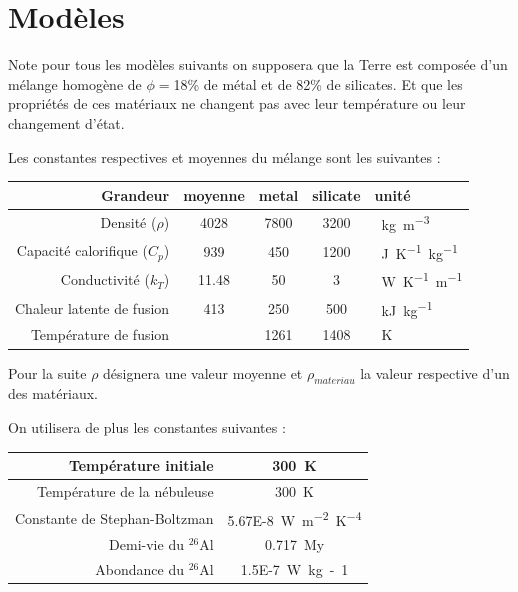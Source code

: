 \documentclass[10pt,a4paper]{article}
\numberwithin{equation}{section}
\begin{document}
\section{Modèles}

Note pour tous les modèles suivants on supposera que la Terre est composée d'un mélange homogène de $\phi = $18\% de métal et de 82\% de silicates. Et que les propriétés de ces matériaux ne changent pas avec leur température ou leur changement d'état.

Les constantes respectives et moyennes du mélange sont les suivantes :
\tabulinesep=0.3mm
\begin{center}
  \begin{tabu}{ r | c c c l}
    Grandeur & moyenne & metal & silicate & unité\\ \hline
    Densité ($\rho$) & 4028 & 7800 &  3200 & \SI{}{kg.m^{-3}}\\ \hline
    Capacité calorifique ($C_p$) & 939 & 450 & 1200 &  \SI{}{J.K^{-1}.kg^{-1}} \\ \hline
    Conductivité ($k_T$)& 11.48 & 50 & 3 & \SI{}{W.K^{-1}.m^{-1}}  \\ \hline    
    Chaleur latente de fusion & 413 & 250 & 500 & \SI{}{kJ.kg^{-1}}\\ \hline
    Température de fusion & & 1261 & 1408 & \SI{}{K}\\ \hline

  \end{tabu}
\end{center}

Pour la suite $\rho$ désignera une valeur moyenne et $\rho_{materiau}$ la valeur respective d'un des matériaux.

On utilisera de plus les constantes suivantes :

\begin{center}
  \begin{tabu}{ r  c }
    \hline
    Température initiale & \SI{300}{K}  \\ \hline
    Température de la nébuleuse & \SI{300}{K}  \\ \hline
    Constante de Stephan-Boltzman & \SI{5.67E-8}{W m^{-2} K^{-4}}  \\ \hline
    Demi-vie du $^{26}$Al & \SI{0.717}{My}  \\ \hline
    Abondance du $^{26}$Al & \SI{1.5E-7}{W kg-1}  \\ \hline
  \end{tabu}
\end{center}
\end{document}
